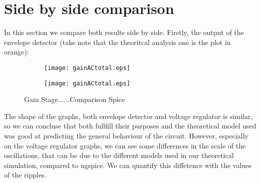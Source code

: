 \section{Side by side comparison}
\label{sec:comparison}

In this section we compare both results side by side. Firstly, the output of the envelope detector (take note that the theoritcal analysis one is the plot in orange):
\begin{figure}[h]
    \centering
    \begin{subfigure}{0.23\textwidth}
        \texttt{[image: gainACtotal.eps]}
        \label{fig:envd1}
    \end{subfigure}
    \begin{subfigure}{0.23\textwidth}
        \texttt{[image: gainACtotal.eps]}
        \label{fig:envd2}
    \end{subfigure}
    \caption{\small Gain Stage......Comparison Spice}
    \label{env_detector}
\end{figure}


The shape of the graphs, both envelope detector and voltage regulator is similar, so we can concluse that both fullfill their purposes and the theoretical model used was good at predicting the general behaviour of the circuit.
However, especially on the voltage regulator graphs, we can see some differences in the scale of the oscillations, that can be due to the different models used in our theoretical simulation, compared to ngspice.
We can quantify this diffetence with the values of the ripples.


